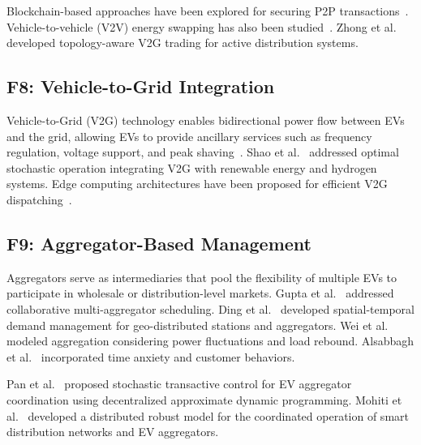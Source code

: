 \documentclass[review]{elsarticle}
\begin{document}
\hspace{0.5cm}Blockchain-based approaches have been explored for securing P2P transactions~\cite{ping2021twostage,chowdhury2025secure}. Vehicle-to-vehicle (V2V) energy swapping has also been studied~\cite{wang2018spatio,zeng2021hierarchical}. Zhong et al.~\cite{zhong2019topology} developed topology-aware V2G trading for active distribution systems.


\subsection{F8: Vehicle-to-Grid Integration}\label{sec:f8}

\hspace{0.5cm}Vehicle-to-Grid (V2G) technology enables bidirectional power flow between EVs and the grid, allowing EVs to provide ancillary services such as frequency regulation, voltage support, and peak shaving~\cite{patil2021grid}. Shao et al.~\cite{shao2021optimal} addressed optimal stochastic operation integrating V2G with renewable energy and hydrogen systems. Edge computing architectures have been proposed for efficient V2G dispatching~\cite{shang2022achieving,shang2024information}.


\subsection{F9: Aggregator-Based Management}\label{sec:f9}

\hspace{0.5cm}Aggregators serve as intermediaries that pool the flexibility of multiple EVs to participate in wholesale or distribution-level markets. Gupta et al.~\cite{gupta2019collaborative} addressed collaborative multi-aggregator scheduling. Ding et al.~\cite{ding2020spatial} developed spatial-temporal demand management for geo-distributed stations and aggregators. Wei et al.~\cite{wei2020aggregation} modeled aggregation considering power fluctuations and load rebound. Alsabbagh et al.~\cite{alsabbagh2021distributed} incorporated time anxiety and customer behaviors.

\hspace{0.5cm}Pan et al.~\cite{pan2020stochastic} proposed stochastic transactive control for EV aggregator coordination using decentralized approximate dynamic programming. Mohiti et al.~\cite{mohiti2019distributed} developed a distributed robust model for the coordinated operation of smart distribution networks and EV aggregators.
\end{document}
